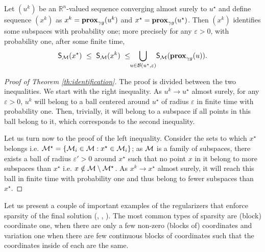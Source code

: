 \begin{theorem}\label{th:identification}
Let $(u^k)$ be an $\mathbb{R}^n$-valued sequence converging almost surely to $u^\star$ and define sequence $(x^k)$ as $x^k = \mathbf{prox}_{\gamma g}(u^k)$ and  $x^\star =  \mathbf{prox}_{\gamma g}(u^\star)$. Then $(x^k)$ identifies some subspaces with probability one; more precisely for any $\varepsilon>0$, with probability one, after some finite time,
\begin{equation}\label{eq:identification_result}
     \mathsf{S}_{\mathcal{M}}(x^\star) ~\leq~ \mathsf{S}_{\mathcal{M}}(x^k) ~\leq\!\!\bigcup_{u\in\mathcal{B}(u^\star,\varepsilon)} \!\mathsf{S}_{\mathcal{M}}(\mathbf{prox}_{\gamma g}(u)).
\end{equation}
\end{theorem}
\begin{proof}[Proof of Theorem \ref{th:identification}]
The proof is divided between the two inequalities. We start with the right inequality. As $u^k \to u^\star$ almost surely, for any $\varepsilon>0$, $u^k$ will belong to a ball centered around $u^\star$ of radius $\varepsilon$ in finite time with probability one. Then, trivially, it will belong to a subspace if all points in this ball belong to it, which corresponds to the second inequality.

Let us turn now to the proof of the left inequality.  Consider the sets to which $x^\star$ belongs i.e. $\mathcal{M}^\star = \{ \mathcal{M}_i\in\mathcal{M} : x^\star \in \mathcal{M}_i \}$; as $\mathcal{M}$ is a family of subspaces, there exists a ball of radius $\varepsilon'>0$ around $x^\star$ such that no point $x$ in it belong to {more} subspaces than $x^\star$ i.e. $x \notin \mathcal{M} \setminus \mathcal{M}^\star$. As $x^k \to x^\star $ almost surely, it will reach this ball in finite time with probability one and thus belong to fewer subspaces than $x^\star$.
\end{proof}

Let us present a couple of important examples of the regularizers that enforce sparsity of the final solution (\cite{argyriou2013sparsity}, \cite{jenatton2011structured}, \cite{zhao2006grouped}). The most common types of sparsity are (block) coordinate one, when there are only a few non-zero (blocks of) coordinates and variation one when there are few continuous blocks of coordinates such that the coordinates inside of each are the same.

